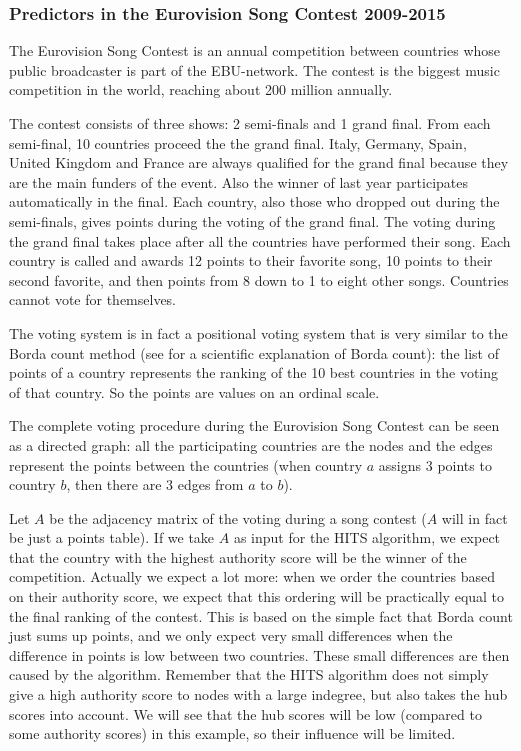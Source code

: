 \documentclass[a4paper,11pt]{report}
\begin{document}
 \subsubsection{Predictors in the Eurovision Song Contest 
 2009-2015}
 The Eurovision Song Contest is an annual competition between countries whose 
 public broadcaster is part of the EBU-network. The contest is the biggest music 
 competition in the world, reaching about 200 million annually.
  
 The contest consists of three shows: 2 semi-finals and 1 grand final. From each 
 semi-final, 10 countries proceed the the grand final. Italy, Germany, Spain, United Kingdom and France are 
 always qualified for the grand final because they are the main funders of the event. 
 Also the winner of last year participates automatically in the final. Each country, also those 
 who dropped out during the semi-finals, gives points during the voting of the grand final. 
The voting during the grand final takes place after all the countries have performed their song. 
Each country is called and awards 12 points to their 
favorite song, 10 points to their second favorite, and then points from 8 down 
to 1 to eight other songs. Countries cannot vote for themselves. 

The voting 
system is in fact a positional voting system that is very similar to the Borda count 
method (see \cite{saari} for a scientific explanation of Borda count): the list 
of points of a country represents the ranking of the 10 best countries in the voting of that country. 
So the points are values on an ordinal scale.

The complete voting procedure during the Eurovision Song Contest can be seen as 
a directed graph: all the participating countries are the nodes and the edges 
represent the points between the countries (when country $a$ assigns 3 points to country $b$, then there are 3 edges from $a$ to 
$b$).

Let $A$ be the adjacency matrix of the voting during a song contest ($A$ will in fact be just a points table). If we 
take $A$ as input for the HITS algorithm, we expect that the country with the 
highest authority score will be the winner of the competition. Actually we 
expect a lot more: when we order the countries based on their authority score, 
we expect that this ordering will be practically equal to the final ranking of the contest. 
This is based on the simple fact that Borda count just sums up points, and we 
only expect very small differences when the difference in points is low between 
two countries. These small differences are then caused by the algorithm. Remember 
that the HITS algorithm does not simply give a high authority score to nodes 
with a large indegree, but also takes the hub scores into account. We will 
see that the hub scores will be low (compared to some authority scores) in this example, so their influence will be limited.
\end{document}
